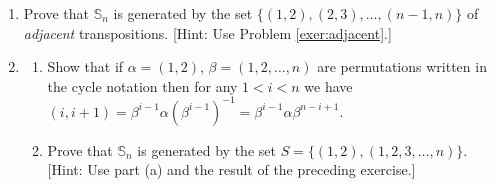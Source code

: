 \documentclass[11pt]{article}
\newenvironment{problems}
{
 \begin{enumerate}[topsep=1pt,itemsep=0pt,parsep=2pt,leftmargin=0.6cm,%
 label={\arabic*.}, ref=\arabic*] \small
}
{
 \end{enumerate}
}
\theoremstyle{definition}
\newcommand{\Sym}{\mathbb{S}}
\begin{document}
\begin{problems}
\begin{enumerate}
 \noindent This shows that it is possible to write any transposition
 as a product of {\em adjacent} ones; i.e., ones of the form
 $(k,k+1)$.
 \end{enumerate}


\item {}\label{ex:adjgen} Prove that $\Sym_n$ is
  generated by the set $\{ (1,2), (2,3), \dots, (n-1,n) \}$ of
  \emph{adjacent} transpositions.  [Hint: Use Problem
    \ref{exer:adjacent}.]

\item{} \label{ex:twogen} 
  \begin{enumerate}
  \item Show that if $\alpha = (1,2)$, $\beta = (1,2,\dots,n)$ are
    permutations written in the cycle notation then for any $1 < i <n$
    we have $(i,i+1) = \beta^{i-1} \alpha (\beta^{i-1})^{-1} =
    \beta^{i-1} \alpha\beta^{n-i+1}$.

  \item Prove that $\Sym_n$ is generated by the set $S = \{ (1,2),
    (1,2,3,\dots,n) \}$. [Hint: Use part (a) and the result of the
    preceding exercise.]
  \end{enumerate}
\end{problems}
\end{document}
